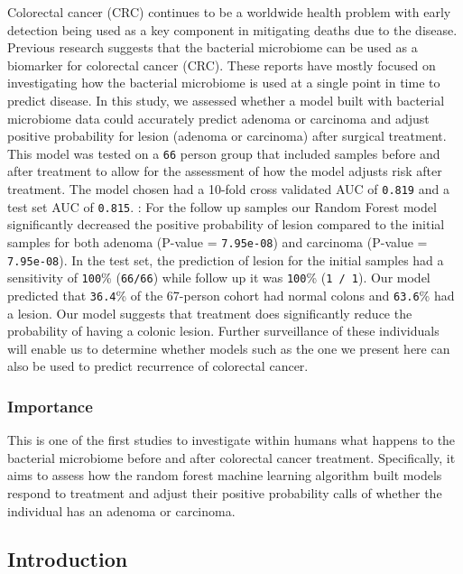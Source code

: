 \documentclass[12pt,]{article}
\begin{document}
Colorectal cancer (CRC) continues to be a worldwide health problem with
early detection being used as a key component in mitigating deaths due
to the disease. Previous research suggests that the bacterial microbiome
can be used as a biomarker for colorectal cancer (CRC). These reports
have mostly focused on investigating how the bacterial microbiome is
used at a single point in time to predict disease. In this study, we
assessed whether a model built with bacterial microbiome data could
accurately predict adenoma or carcinoma and adjust positive probability
for lesion (adenoma or carcinoma) after surgical treatment. This model
was tested on a \texttt{66} person group that included samples before
and after treatment to allow for the assessment of how the model adjusts
risk after treatment. The model chosen had a 10-fold cross validated AUC
of \texttt{0.819} and a test set AUC of \texttt{0.815}. : For the follow
up samples our Random Forest model significantly decreased the positive
probability of lesion compared to the initial samples for both adenoma
(P-value = \texttt{7.95e-08}) and carcinoma (P-value =
\texttt{7.95e-08}). In the test set, the prediction of lesion for the
initial samples had a sensitivity of \texttt{100}\% (\texttt{66/66})
while follow up it was \texttt{100}\% (\texttt{1\ /\ 1}). Our model
predicted that \texttt{36.4}\% of the 67-person cohort had normal colons
and \texttt{63.6}\% had a lesion. Our model suggests that treatment does
significantly reduce the probability of having a colonic lesion. Further
surveillance of these individuals will enable us to determine whether
models such as the one we present here can also be used to predict
recurrence of colorectal cancer.

\newpage

\subsubsection{Importance}\label{importance}

This is one of the first studies to investigate within humans what
happens to the bacterial microbiome before and after colorectal cancer
treatment. Specifically, it aims to assess how the random forest machine
learning algorithm built models respond to treatment and adjust their
positive probability calls of whether the individual has an adenoma or
carcinoma.

\newpage

\subsection{Introduction}\label{introduction}
\end{document}

